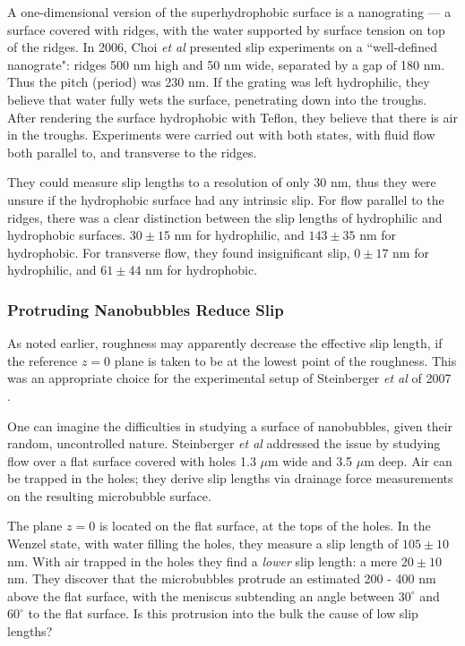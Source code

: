 \documentclass[12pt, a4paper, twoside, openright]{book}
\begin{document}
\vspace*{1em}

A one-dimensional version of the superhydrophobic surface is a nanograting --- a surface covered with ridges, with the water supported by surface tension on top of the ridges.  In 2006, Choi \emph{et al} \cite{Choi2006} presented slip experiments on a ``well-defined nanograte": ridges 500 nm high and 50 nm wide, separated by a gap of 180 nm.  Thus the pitch (period) was 230 nm.
If the grating was left hydrophilic, they believe that water fully wets the surface, penetrating down into the troughs.  After rendering the surface hydrophobic with Teflon, they believe that there is air in the troughs.  Experiments were carried out with both states, with fluid flow both parallel to, and transverse to the ridges.

They could measure slip lengths to a resolution of only 30 nm, thus they were unsure if the hydrophobic surface had any intrinsic slip.  For flow parallel to the ridges, there was a clear distinction between the slip lengths of hydrophilic and hydrophobic surfaces.  $30 \pm 15$ nm for hydrophilic, and $143 \pm 35$ nm for hydrophobic.  For transverse flow, they found insignificant slip, $0 \pm 17$ nm for hydrophilic, and $61 \pm 44$ nm for hydrophobic.



\subsubsection{Protruding Nanobubbles Reduce Slip}

As noted earlier, roughness may apparently decrease the effective slip length, if the reference $z=0$ plane is taken to be at the lowest point of the roughness.  This was an appropriate choice for the experimental setup of Steinberger \emph{et al} of 2007 \cite{Steinberger2007}.

One can imagine the difficulties in studying a surface of nanobubbles, given their random, uncontrolled nature.  Steinberger \emph{et al} addressed the issue by studying flow over a flat surface covered with holes 1.3 $\mu$m wide and 3.5 $\mu$m deep.  Air can be trapped in the holes; they derive slip lengths via drainage force measurements on the resulting microbubble surface.

The plane $z=0$ is located on the flat surface, at the tops of the holes.  In the Wenzel state, with water filling the holes, they measure a slip length of $105 \pm 10$ nm.  With air trapped in the holes they find a \emph{lower} slip length: a mere $20 \pm 10$ nm.
They discover that the microbubbles protrude an estimated 200 - 400 nm above the flat surface, with the meniscus subtending an angle between $30^{\circ}$ and $60^{\circ}$ to the flat surface.  Is this protrusion into the bulk the cause of low slip lengths?
\end{document}
